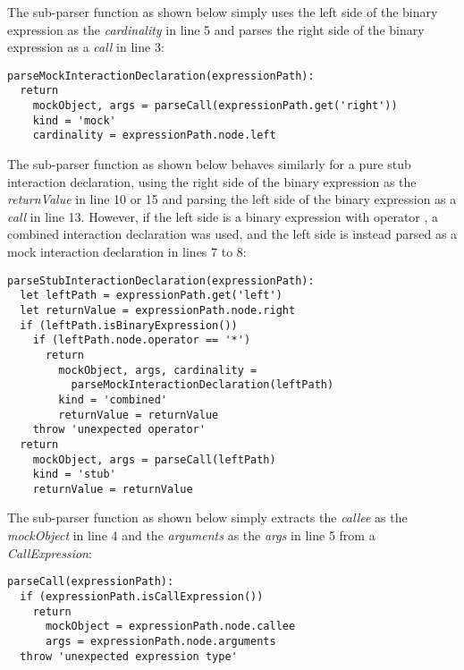The sub-parser function  as shown below simply
uses the left side of the binary expression as the \textit{cardinality}
in line 5
and parses the right side of the binary expression as a \textit{call}
in line 3:
\begin{verbatim}
parseMockInteractionDeclaration(expressionPath):
  return
    mockObject, args = parseCall(expressionPath.get('right'))
    kind = 'mock'
    cardinality = expressionPath.node.left
\end{verbatim}

The sub-parser function  as shown below
behaves similarly for a pure stub interaction declaration,
using the right side of the binary expression as the \textit{returnValue} in line 10 or 15
and parsing the left side of the binary expression as a \textit{call} in line 13.
However, if the left side is a binary expression with operator ,
a combined interaction declaration was used,
and the left side is instead parsed as a mock interaction declaration in lines 7 to 8:
\begin{verbatim}
parseStubInteractionDeclaration(expressionPath):
  let leftPath = expressionPath.get('left')
  let returnValue = expressionPath.node.right
  if (leftPath.isBinaryExpression())
    if (leftPath.node.operator == '*')
      return
        mockObject, args, cardinality =
          parseMockInteractionDeclaration(leftPath)
        kind = 'combined'
        returnValue = returnValue
    throw 'unexpected operator'
  return
    mockObject, args = parseCall(leftPath)
    kind = 'stub'
    returnValue = returnValue
\end{verbatim}

The sub-parser function  as shown below
simply extracts the \textit{callee} as the \textit{mockObject} in line 4
and the \textit{arguments} as the \textit{args} in line 5
from a \textit{CallExpression}:
\begin{verbatim}
parseCall(expressionPath):
  if (expressionPath.isCallExpression())
    return
      mockObject = expressionPath.node.callee
      args = expressionPath.node.arguments
  throw 'unexpected expression type'
\end{verbatim}
